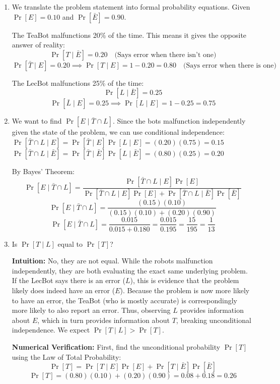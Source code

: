 \documentclass[11pt]{article}
\begin{document}
\begin{enumerate}[label=\textbf{(\alph*)}]
    \item We translate the problem statement into formal probability equations. 
    Given $\Pr[E] = 0.10$ and $\Pr[\bar{E}] = 0.90$. 
    
    The TeaBot malfunctions 20\% of the time. This means it gives the opposite answer of reality:
    $$ \Pr[T \mid \bar{E}] = 0.20 \quad \text{(Says error when there isn't one)} $$
    $$ \Pr[\bar{T} \mid E] = 0.20 \implies \Pr[T \mid E] = 1 - 0.20 = 0.80 \quad \text{(Says error when there is one)} $$
    
    The LecBot malfunctions 25\% of the time:
    $$ \Pr[L \mid \bar{E}] = 0.25 $$
    $$ \Pr[\bar{L} \mid E] = 0.25 \implies \Pr[L \mid E] = 1 - 0.25 = 0.75 $$

    \item We want to find $\Pr[E \mid \bar{T} \cap L]$. 
    Since the bots malfunction independently given the state of the problem, we can use conditional independence: 
    $\Pr[\bar{T} \cap L \mid E] = \Pr[\bar{T} \mid E] \Pr[L \mid E] = (0.20)(0.75) = 0.15$
    $\Pr[\bar{T} \cap L \mid \bar{E}] = \Pr[\bar{T} \mid \bar{E}] \Pr[L \mid \bar{E}] = (0.80)(0.25) = 0.20$

    By Bayes' Theorem:
    $$ \Pr[E \mid \bar{T} \cap L] = \frac{\Pr[\bar{T} \cap L \mid E] \Pr[E]}{\Pr[\bar{T} \cap L \mid E] \Pr[E] + \Pr[\bar{T} \cap L \mid \bar{E}] \Pr[\bar{E}]} $$
    $$ \Pr[E \mid \bar{T} \cap L] = \frac{(0.15)(0.10)}{(0.15)(0.10) + (0.20)(0.90)} $$
    $$ \Pr[E \mid \bar{T} \cap L] = \frac{0.015}{0.015 + 0.180} = \frac{0.015}{0.195} = \frac{15}{195} = \frac{1}{13} $$

    \item Is $\Pr[T \mid L]$ equal to $\Pr[T]$?
    
    \textbf{Intuition:} No, they are not equal. While the robots malfunction independently, they are both evaluating the exact same underlying problem. If the LecBot says there is an error ($L$), this is evidence that the problem likely does indeed have an error ($E$). Because the problem is now more likely to have an error, the TeaBot (who is mostly accurate) is correspondingly more likely to also report an error. Thus, observing $L$ provides information about $E$, which in turn provides information about $T$, breaking unconditional independence. We expect $\Pr[T \mid L] > \Pr[T]$.
    
    \textbf{Numerical Verification:}
    First, find the unconditional probability $\Pr[T]$ using the Law of Total Probability:
    $$ \Pr[T] = \Pr[T \mid E]\Pr[E] + \Pr[T \mid \bar{E}]\Pr[\bar{E}] $$
    $$ \Pr[T] = (0.80)(0.10) + (0.20)(0.90) = 0.08 + 0.18 = 0.26 $$
    

\end{enumerate}
\end{document}
